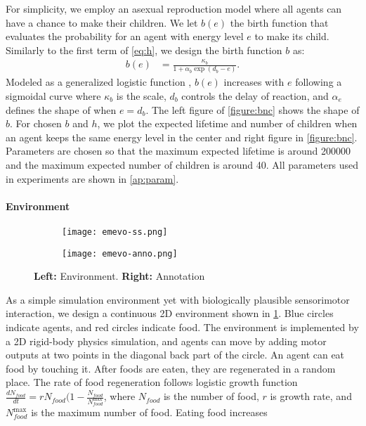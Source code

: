 For simplicity, we employ an asexual reproduction model where all agents can have a chance to make their children. We let $b(e)$ the birth function that evaluates the probability for an agent with energy level $e$ to make its child. Similarly to the first term of \cref{eq:h}, we design the birth function $b$ as:
\begin{align}
 b(e) &=  \frac{\kappa_{b}}{1 + \alpha_{b}\exp(d_{b} - e)}. \label{eq:b}
\end{align}
Modeled as a generalized logistic function \citep{richardsFlexibleGrowthFunction1959}, $b(e)$ increases with $e$ following a sigmoidal curve where $\kappa_{b}$ is the scale, $d_{b}$ controls the delay of reaction, and $\alpha_{e}$ defines the shape of when $e=d_{b}$. The left figure of \cref{figure:bnc} shows the shape of $b$. For chosen $b$ and $h$, we plot the expected lifetime and number of children when an agent keeps the same energy level in the center and right figure in \cref{figure:bnc}. Parameters are chosen so that the maximum expected lifetime is around \num{200000} and the maximum expected number of children is around 40. All parameters used in experiments are shown in \cref{ap:param}.

\paragraph{Environment}

\begin{figure}[t]
  \begin{subfigure}[t]{6cm}
    \centering
    \texttt{[image: emevo-ss.png]}
  \end{subfigure}
  \begin{subfigure}[t]{8cm}
    \centering
    \texttt{[image: emevo-anno.png]}
  \end{subfigure}
  \caption{
    \textbf{Left:} Environment.
    \textbf{Right:} Annotation
  }\label{figure:env}
\end{figure}

As a simple simulation environment yet with biologically plausible sensorimotor interaction, we design a continuous 2D environment shown in \cref{figure:env}. Blue circles indicate agents, and red circles indicate food. The environment is implemented by a 2D rigid-body physics simulation, and agents can move by adding motor outputs at two points in the diagonal back part of the circle. An agent can eat food by touching it. After foods are eaten, they are regenerated in a random place. The rate of food regeneration follows logistic growth function $\frac{dN_{food}}{dt} = r N_{food} (1 - \frac{N_{food}}{N_{food}^{\mathrm{max}}}$, where $N_{food}$ is the number of food, $r$ is growth rate, and $N_{food}^{\mathrm{max}}$ is the maximum number of food. Eating food increases

